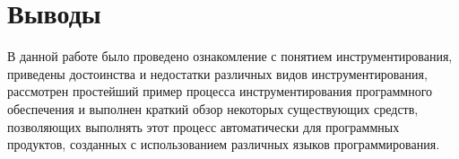 \section{Выводы}

В данной работе было проведено ознакомление с понятием инструментирования, приведены достоинства и недостатки различных видов инструментирования, рассмотрен простейший пример процесса инструментирования программного обеспечения и выполнен краткий обзор некоторых существующих средств, позволяющих выполнять этот процесс автоматически для программных продуктов, созданных с использованием различных языков программирования.
